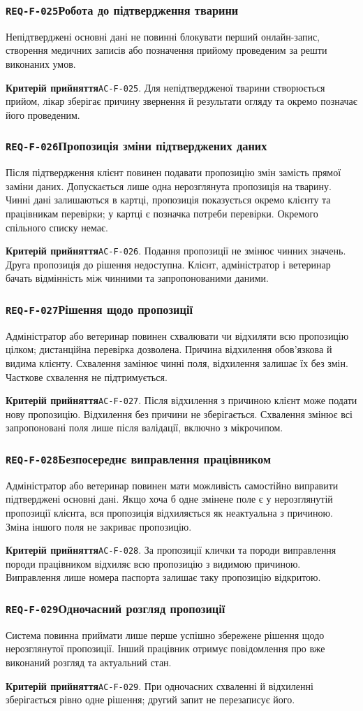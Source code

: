 \documentclass[11pt,a4paper]{article}
\newcommand{\requirement}[4]{%
  \Needspace{7\baselineskip}%
  \subsubsection*{\hypertarget{#1}{\texttt{#1}}\quad #2}%
  #3\par
  \textbf{Критерій прийняття}\quad #4\par\medskip}
\begin{document}
\requirement{REQ-F-025}{Робота до підтвердження тварини}{Непідтверджені основні дані не повинні блокувати перший онлайн-запис, створення медичних записів або позначення прийому проведеним за решти виконаних умов.}{\hypertarget{AC-F-025}{\texttt{AC-F-025}}. Для непідтвердженої тварини створюється прийом, лікар зберігає причину звернення й результати огляду та окремо позначає його проведеним.}

\requirement{REQ-F-026}{Пропозиція зміни підтверджених даних}{Після підтвердження клієнт повинен подавати пропозицію змін замість прямої заміни даних. Допускається лише одна нерозглянута пропозиція на тварину. Чинні дані залишаються в картці, пропозиція показується окремо клієнту та працівникам перевірки; у картці є позначка потреби перевірки. Окремого спільного списку немає.}{\hypertarget{AC-F-026}{\texttt{AC-F-026}}. Подання пропозиції не змінює чинних значень. Друга пропозиція до рішення недоступна. Клієнт, адміністратор і ветеринар бачать відмінність між чинними та запропонованими даними.}

\requirement{REQ-F-027}{Рішення щодо пропозиції}{Адміністратор або ветеринар повинен схвалювати чи відхиляти всю пропозицію цілком; дистанційна перевірка дозволена. Причина відхилення обов’язкова й видима клієнту. Схвалення замінює чинні поля, відхилення залишає їх без змін. Часткове схвалення не підтримується.}{\hypertarget{AC-F-027}{\texttt{AC-F-027}}. Після відхилення з причиною клієнт може подати нову пропозицію. Відхилення без причини не зберігається. Схвалення змінює всі запропоновані поля лише після валідації, включно з мікрочипом.}

\requirement{REQ-F-028}{Безпосереднє виправлення працівником}{Адміністратор або ветеринар повинен мати можливість самостійно виправити підтверджені основні дані. Якщо хоча б одне змінене поле є у нерозглянутій пропозиції клієнта, вся пропозиція відхиляється як неактуальна з причиною. Зміна іншого поля не закриває пропозицію.}{\hypertarget{AC-F-028}{\texttt{AC-F-028}}. За пропозиції клички та породи виправлення породи працівником відхиляє всю пропозицію з видимою причиною. Виправлення лише номера паспорта залишає таку пропозицію відкритою.}

\requirement{REQ-F-029}{Одночасний розгляд пропозиції}{Система повинна приймати лише перше успішно збережене рішення щодо нерозглянутої пропозиції. Інший працівник отримує повідомлення про вже виконаний розгляд та актуальний стан.}{\hypertarget{AC-F-029}{\texttt{AC-F-029}}. При одночасних схваленні й відхиленні зберігається рівно одне рішення; другий запит не перезаписує його.}
\end{document}
